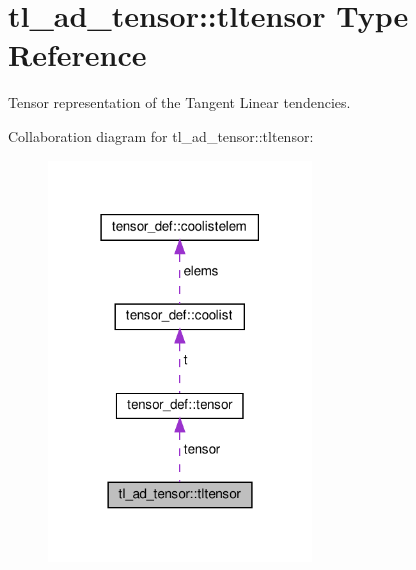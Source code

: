 \hypertarget{structtl__ad__tensor_1_1tltensor}{}\section{tl\+\_\+ad\+\_\+tensor\+:\+:tltensor Type Reference}
\label{structtl__ad__tensor_1_1tltensor}


Tensor representation of the Tangent Linear tendencies.  




Collaboration diagram for tl\+\_\+ad\+\_\+tensor\+:\+:tltensor\+:\nopagebreak
\begin{figure}[H]
\begin{center}
\leavevmode
\includegraphics[width=198pt]{structtl__ad__tensor_1_1tltensor__coll__graph}
\end{center}
\end{figure}
